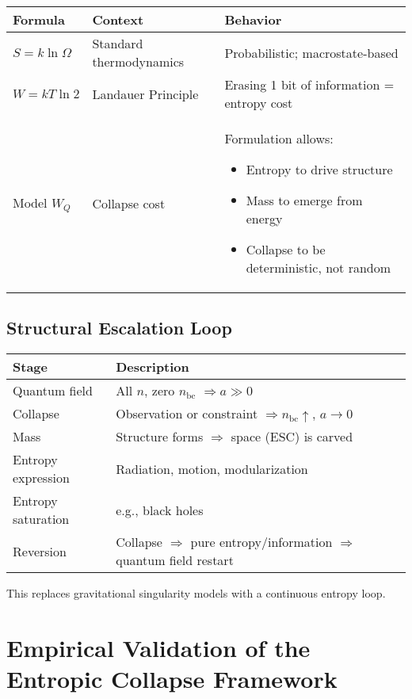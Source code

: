 \documentclass[12pt]{article}
\begin{document}
\begin{center}
\begin{tabular}{|l|l|p{8cm}|}
\hline
\textbf{Formula} & \textbf{Context} & \textbf{Behavior} \\
\hline
$S = k \ln \Omega$ & Standard thermodynamics & Probabilistic; macrostate-based \\
\hline
$W = kT \ln 2$ & Landauer Principle & Erasing 1 bit of information = entropy cost \\
\hline
Model $W_Q$ & Collapse cost & Formulation allows:
\begin{itemize}
    \item Entropy to drive structure
    \item Mass to emerge from energy
    \item Collapse to be deterministic, not random
\end{itemize} \\
\hline
\end{tabular}
\end{center}



\subsection{Structural Escalation Loop}

\begin{center}
\begin{tabular}{|l|p{11cm}|}
\hline
\textbf{Stage} & \textbf{Description} \\
\hline
Quantum field & All $n$, zero $n_{\text{bc}}$ $\Rightarrow a \gg 0$ \\
\hline
Collapse & Observation or constraint $\Rightarrow n_{\text{bc}} \uparrow$, $a \to 0$ \\
\hline
Mass & Structure forms $\Rightarrow$ space (ESC) is carved \\
\hline
Entropy expression & Radiation, motion, modularization \\
\hline
Entropy saturation & e.g., black holes \\
\hline
Reversion & Collapse $\Rightarrow$ pure entropy/information $\Rightarrow$ quantum field restart \\
\hline
\end{tabular}
\end{center}

This replaces gravitational singularity models with a continuous entropy loop.

\section{Empirical Validation of the Entropic Collapse Framework}
\end{document}
